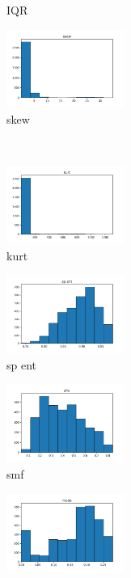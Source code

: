 \documentclass[a4paper]{article}
\begin{document}
\begin{figure}
\begin{subfigure}{0.32\textwidth}
        \caption{IQR}
        \label{fig:sub_raw_5}
    \end{subfigure}\hfill
    \begin{subfigure}{0.32\textwidth}
        \centering
        \includegraphics[width=3.85cm]{raw_5_skew}
        \caption{skew}
        \label{fig:sub_raw_6}
    \end{subfigure}
    \\
    \begin{subfigure}{0.32\textwidth}
        \centering
        \includegraphics[width=3.85cm]{raw_6_kurt}
        \caption{kurt}
        \label{fig:sub_raw_7}
    \end{subfigure}\hfill
    \begin{subfigure}{0.32\textwidth}
        \centering
        \includegraphics[width=3.85cm]{raw_7_sp_ent}
        \caption{sp ent}
        \label{fig:sub_raw_8}
    \end{subfigure}\hfill
    \begin{subfigure}{0.32\textwidth}
        \centering
        \includegraphics[width=3.85cm]{raw_8_sfm}
        \caption{smf}
        \label{fig:sub_raw_9}
    \end{subfigure}\hfill
    \begin{subfigure}{0.32\textwidth}
        \centering
        \includegraphics[width=3.85cm]{raw_9_mode}

\end{subfigure}
\end{figure}
\end{document}
